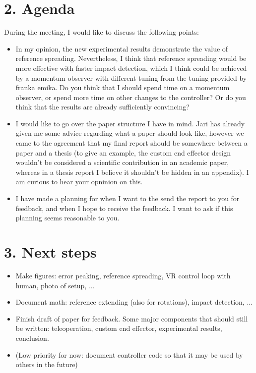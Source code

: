 \documentclass[11pt]{report}
\numberwithin{equation}{section}        %
\numberwithin{figure}{section}          %
\numberwithin{table}{section}           %
\begin{document}
  \section*{2. Agenda}
  During the meeting, I would like to discuss the following points:
  
      \begin{itemize}
        \item In my opinion, the new experimental results demonstrate the value of reference spreading. Nevertheless, I think that reference spreading would be more effective with faster impact detection, which I think could be achieved by a momentum observer with different tuning from the tuning provided by franka emika. Do you think that I should spend time on a momentum observer, or spend more time on other changes to the controller? Or do you think that the results are already sufficiently convincing?
  \item I would like to go over the paper structure I have in mind. Jari has already given me some advice regarding what a paper should look like, however we came to the agreement that my final report should be somewhere between a paper and a thesis (to give an example, the custom end effector design wouldn't be considered a scientific contribution in an academic paper, whereas in a thesis report I believe it shouldn't be hidden in an appendix). I am curious to hear your opninion on this.
  \item I have made a planning for when I want to the send the report to you for feedback, and when I hope to receive the feedback. I want to ask if this planning seems reasonable to you.
  \end{itemize}

  \section*{3. Next steps}

  \begin{itemize}
      \item Make figures: error peaking, reference spreading, VR control loop with human, photo of setup, ...
      \item Document math: reference extending (also for rotations), impact detection, ...
      \item Finish draft of paper for feedback. Some major components that should still be written: teleoperation, custom end effector, experimental results, conclusion.
      \item (Low priority for now: document controller code so that it may be used by others in the future)
  \end{itemize}
\end{document}
